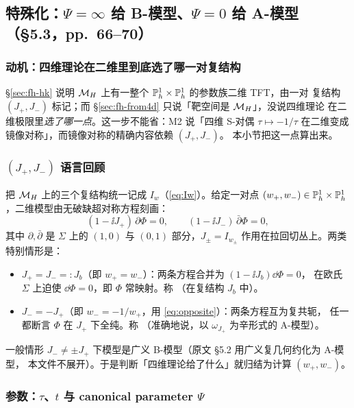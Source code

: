 \subsection{特殊化：$\Psi=\infty$ 给 B-模型、$\Psi=0$ 给 A-模型（§5.3，pp.~66--70）}
\label{sec:fh-spec}

\subsubsection*{动机：四维理论在二维里到底选了哪一对复结构}

§\ref{sec:fh-hk} 说明 $\mathcal{M}_H$ 上有一整个 $\mathbb{P}^1_h\times\mathbb{P}^1_h$ 的参数族二维 TFT，由一对
复结构 $(J_+,J_-)$ 标记；而 §\ref{sec:fh-from4d} 只说「靶空间是 $\mathcal{M}_H$」，没说四维理论
在二维极限里\emph{选了哪一点}。这一步不能省：M2 说「四维 S-对偶
$\tau\mapsto-1/\tau$ 在二维变成镜像对称」，而镜像对称的精确内容依赖 $(J_+,J_-)$。
本小节把这一点算出来。

\subsubsection*{$(J_+,J_-)$ 语言回顾}

把 $\mathcal{M}_H$ 上的三个复结构统一记成 $I_w$（\eqref{eq:Iw}）。给定一对点
$(w_+,w_-)\in\mathbb{P}^1_h\times\mathbb{P}^1_h$，二维模型由无破缺超对称方程刻画：\pA{}
\begin{equation}
(1-\ii J_+)\,\partial\Phi=0,\qquad (1-\ii J_-)\,\bar\partial\Phi=0 ,
\label{eq:susy-pair}
\end{equation}
其中 $\partial,\bar\partial$ 是 $\Sigma$ 上的 $(1,0)$ 与 $(0,1)$ 部分，$J_\pm=I_{w_\pm}$
作用在拉回切丛上。两类特别情形是：
\begin{itemize}
\item $J_+=J_-=:J_b$（即 $w_+=w_-$）：两条方程合并为 $(1-\ii J_b)\dd\Phi=0$，
  在欧氏 $\Sigma$ 上迫使 $\dd\Phi=0$，即 $\Phi$ 常映射。称
  （在复结构 $J_b$ 中）。
\item $J_-=-J_+$（即 $w_-=-1/w_+$，用 \eqref{eq:opposite}）：两条方程互为复共轭，
  任一都断言 $\Phi$ 在 $J_+$ 下全纯。称 （准确地说，以
  $\omega_{J_+}$ 为辛形式的 A-模型）。
\end{itemize}
一般情形 $J_-\ne\pm J_+$ 下模型是广义 B-模型（原文 §5.2 用广义复几何约化为 A-模型，
本文件不展开）。于是判断「四维理论给了什么」就归结为计算 $(w_+,w_-)$。\pA{}

\subsubsection*{参数：$\tau$、$t$ 与 canonical parameter $\Psi$}

